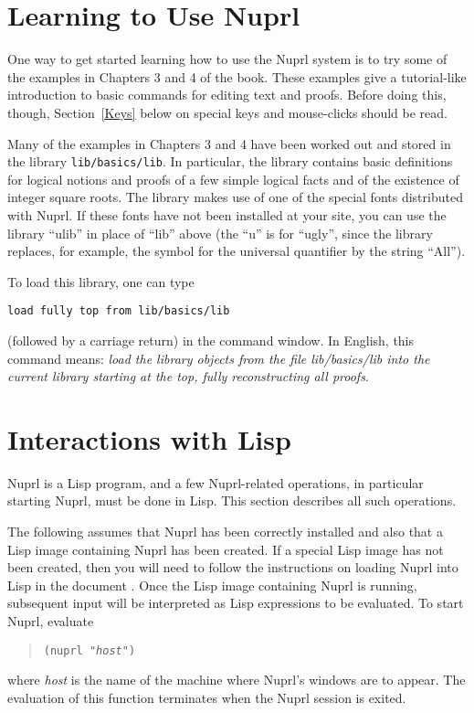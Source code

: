 \section{Learning to Use Nuprl}

One way to get started learning how to use the Nuprl system is to try
some of the examples in Chapters 3 and 4 of the book.  These examples
give a tutorial-like introduction to basic commands for editing text
and proofs.  Before doing this, though, Section~\ref{Keys} below on
special keys and mouse-clicks should be read.

Many of the examples in Chapters 3 and 4 have been worked out and
stored in the library {\tt lib/basics/lib}.  In particular, the
library contains basic definitions for logical notions and proofs of a
few simple logical facts and of the existence of integer square roots.
The library makes use of one of the special fonts distributed with
Nuprl.  If these fonts have not been installed at your site, you can
use the library ``ulib'' in place of ``lib'' above (the ``u'' is for
``ugly'', since the library replaces, for example, the symbol for the
universal quantifier by the string ``All'').

To load this library, one can type
\begin{center}
 \tt load fully top from lib/basics/lib
\end{center}
(followed by a carriage return) in the command window.  In English, 
this command means: {\em load the library objects from the file
lib/basics/lib into the current library starting at the top, fully
reconstructing all proofs}.


\section{Interactions with Lisp}

Nuprl is a Lisp program, and a few Nuprl-related operations, in
particular starting Nuprl, must be done in Lisp.  This section
describes all such operations.

The following assumes that Nuprl has been correctly installed and also that
a Lisp image containing Nuprl has been created.  If a special Lisp image
has not been created, then you will need to follow the instructions on
loading Nuprl into Lisp in the document .  Once
the Lisp image containing Nuprl is running, subsequent input will be
interpreted as Lisp expressions to be evaluated.  To start Nuprl, evaluate
\begin{quote}
  \tt (nuprl "{\em host}")
\end{quote}
where {\em host} is the name of the machine where  Nuprl's
windows are to appear.  
The evaluation of this function terminates when the
Nuprl session is exited.   

